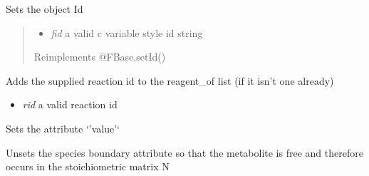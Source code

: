 \documentclass[a4paper,11pt,english]{sphinxmanual}
\begin{document}
\begin{fulllineitems}
\begin{fulllineitems}
\begin{itemize}
\end{itemize}

\end{fulllineitems}


\begin{fulllineitems}
\label{modules_doc:cbmpy.CBModel.Species.setId}
Sets the object Id
\begin{quote}
\begin{itemize}
\item {} 
\emph{fid} a valid c variable style id string

\end{itemize}

Reimplements @FBase.setId()
\end{quote}

\end{fulllineitems}


\begin{fulllineitems}
\label{modules_doc:cbmpy.CBModel.Species.setReagentOf}
Adds the supplied reaction id to the reagent\_of list (if it isn't one already)
\begin{itemize}
\item {} 
\emph{rid} a valid reaction id

\end{itemize}

\end{fulllineitems}


\begin{fulllineitems}
\label{modules_doc:cbmpy.CBModel.Species.setValue}
Sets the attribute `'value'`

\end{fulllineitems}


\begin{fulllineitems}
\label{modules_doc:cbmpy.CBModel.Species.unsetBoundary}
Unsets the species boundary attribute so that the metabolite is free and therefore occurs in the stoichiometric matrix N

\end{fulllineitems}


\end{fulllineitems}
\end{document}
